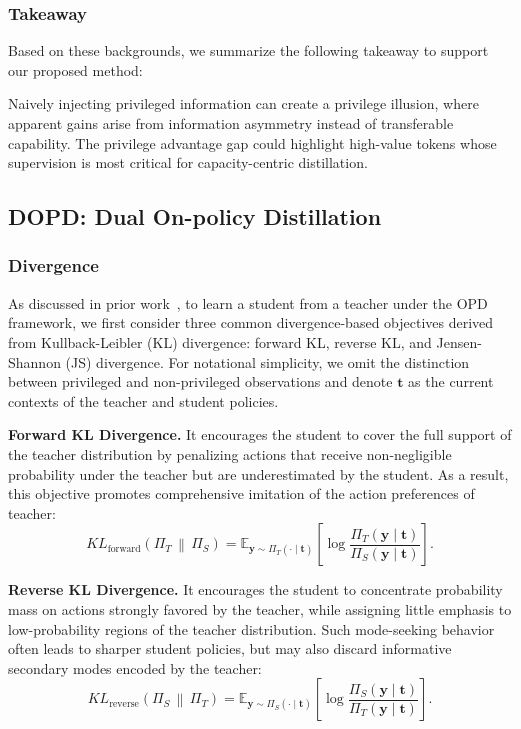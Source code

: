 \documentclass[]{jingdong}
\theoremstyle{plain}
\theoremstyle{definition}
\theoremstyle{remark}
\begin{document}
\subsubsection{Takeaway}
Based on these backgrounds, we summarize the following takeaway to support our proposed method:
\begin{takeaway}
Naively injecting privileged information can create a privilege illusion, where apparent gains arise from information asymmetry instead of transferable capability. The privilege advantage gap could highlight high-value tokens whose supervision is most critical for capacity-centric distillation.
\end{takeaway}



\subsection{DOPD: Dual On-policy Distillation}
\label{sec:dopd}
\subsubsection{Divergence}
As discussed in prior work~\citep{hubotter2026reinforcement,jin2026entropy,li2026rethinking}, to learn a student from a teacher under the OPD framework, we first consider three common divergence-based objectives derived from Kullback-Leibler (KL) divergence: forward KL, reverse KL, and Jensen-Shannon (JS) divergence. For notational simplicity, we omit the distinction between privileged and non-privileged observations and denote $\mathbf{t}$ as the current contexts of the teacher and student policies.



\noindent\textbf{Forward KL Divergence.}
It encourages the student to cover the full support of the teacher distribution by penalizing actions that receive non-negligible probability under the teacher but are underestimated by the student. As a result, this objective promotes comprehensive imitation of the action preferences of teacher:
\begin{equation}
    KL_{\mathrm{forward}}\left(\Pi_{T}\,\middle\|\,\Pi_{S}\right) = \mathbb{E}_{\mathbf{y} \sim \Pi_{T}\left(\cdot \mid \mathbf{t}\right)} \left[ \log \frac{ \Pi_{T}\left(\mathbf{y} \mid \mathbf{t}\right) }{ \Pi_{S}\left(\mathbf{y} \mid \mathbf{t}\right) } \right].
\end{equation}

\noindent\textbf{Reverse KL Divergence.}
It encourages the student to concentrate probability mass on actions strongly favored by the teacher, while assigning little emphasis to low-probability regions of the teacher distribution. Such mode-seeking behavior often leads to sharper student policies, but may also discard informative secondary modes encoded by the teacher:
\begin{equation}
    KL_{\mathrm{reverse}} \left(\Pi_{S}\,\middle\|\,\Pi_{T}\right) = \mathbb{E}_{\mathbf{y} \sim \Pi_{S}\left(\cdot \mid \mathbf{t}\right)} \left[ \log \frac{ \Pi_{S}\left(\mathbf{y} \mid \mathbf{t}\right) }{ \Pi_{T}\left(\mathbf{y} \mid \mathbf{t}\right) } \right].
\end{equation}
\end{document}
